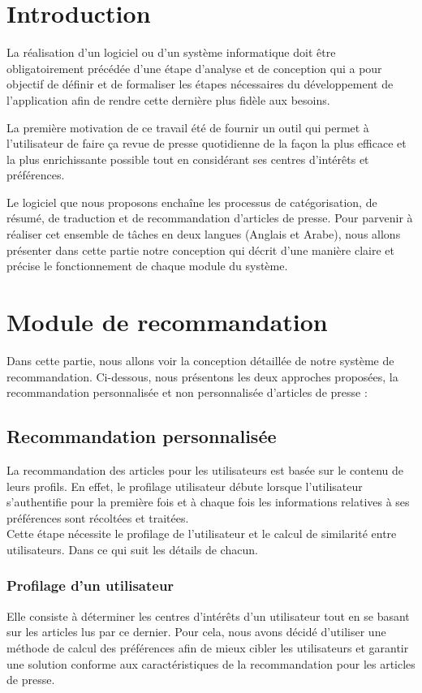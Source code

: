
\newpage
\section{Introduction}
La réalisation d'un logiciel ou d'un système informatique doit être obligatoirement précédée d'une étape d'analyse et de conception qui a pour objectif de définir et de formaliser les étapes nécessaires du développement de l'application afin de rendre cette dernière plus fidèle aux besoins.

La première motivation de ce travail été de fournir un outil qui permet à l'utilisateur de faire ça revue de presse quotidienne de la façon la plus efficace et la plus enrichissante possible tout en considérant ses centres d'intérêts et préférences. 

Le logiciel que nous proposons enchaîne les processus de catégorisation, de résumé, de traduction et de recommandation d'articles de presse. Pour parvenir à réaliser cet ensemble de tâches en deux langues (Anglais et Arabe), nous allons présenter dans cette partie notre conception qui décrit d'une manière claire et précise le fonctionnement de chaque module du système. 


\section{Module de recommandation}
Dans cette partie, nous allons voir la conception détaillée de notre système de recommandation. Ci-dessous, nous présentons les deux approches proposées, la recommandation personnalisée et non personnalisée d'articles de presse  : 
    \subsection{Recommandation personnalisée}
    La recommandation des articles pour les utilisateurs est basée sur le contenu de leurs profils. En effet, le profilage utilisateur débute lorsque l'utilisateur s'authentifie pour la première fois et à chaque fois les informations relatives à ses préférences sont récoltées et traitées.\\
    Cette étape nécessite le profilage de l'utilisateur et le calcul de similarité entre utilisateurs. Dans ce qui suit les détails de chacun.

        \subsubsection{Profilage d'un utilisateur}
        Elle consiste à déterminer les centres d'intérêts d'un utilisateur tout en se basant sur les articles lus par ce dernier. Pour cela, nous avons décidé d'utiliser une méthode de calcul des préférences afin de mieux cibler les utilisateurs et garantir une solution conforme aux caractéristiques de la recommandation pour les articles de presse. 

